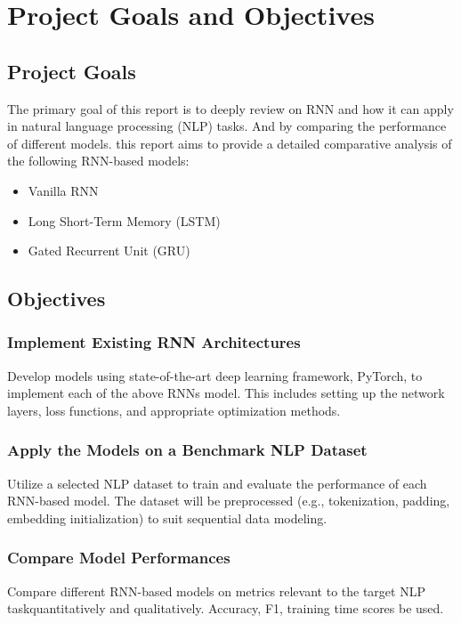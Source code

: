 \documentclass[12pt,a4paper]{article}
\begin{document}

\section{Project Goals and Objectives}

\subsection{Project Goals}
The primary goal of this report is to deeply review on RNN and how it can apply in natural language processing (NLP) tasks. And by comparing the performance of different models. this report aims to provide a detailed comparative analysis of the following RNN-based models:
\begin{itemize}
    \item Vanilla RNN
    \item Long Short-Term Memory (LSTM)
    \item Gated Recurrent Unit (GRU)
\end{itemize}

\subsection{Objectives}
\subsubsection{Implement Existing RNN Architectures}
Develop models using state-of-the-art deep learning framework, PyTorch, to implement each of the above RNNs model. This includes setting up the network layers, loss functions, and appropriate optimization methods.
\subsubsection{Apply the Models on a Benchmark NLP Dataset}
Utilize a selected NLP dataset to train and evaluate the performance of each RNN-based model. The dataset will be preprocessed (e.g., tokenization, padding, embedding initialization) to suit sequential data modeling.
\subsubsection{Compare Model Performances}
Compare different RNN-based models on metrics relevant to the target NLP taskquantitatively and qualitatively. Accuracy, F1, training time scores be used.
\end{document}
